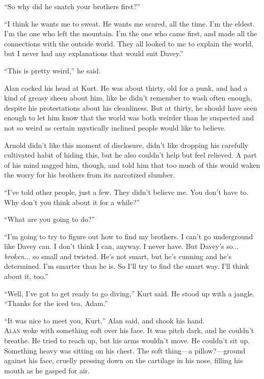 ``So why did he snatch your brothers first?''

``I think he wants me to sweat.  He wants me scared, all the time. 
I'm the eldest.  I'm the one who left the mountain.  I'm the one who
came first, and made all the connections with the outside world.  They
all looked to me to explain the world, but I never had any
explanations that would suit Davey.''

``This is pretty weird,'' he said.

Alan cocked his head at Kurt.  He was about thirty, old for a punk,
and had a kind of greasy sheen about him, like he didn't remember to
wash often enough, despite his protestations about his cleanliness. 
But at thirty, he should have seen enough to let him know that the
world was both weirder than he suspected and not so weird as certain
mystically inclined people would like to believe.

Arnold didn't like this moment of disclosure, didn't like dropping his
carefully cultivated habit of hiding this, but he also couldn't help
but feel relieved.  A part of his mind nagged him, though, and told
him that too much of this would waken the worry for his brothers from
its narcotized slumber.

``I've told other people, just a few.  They didn't believe me.  You
don't have to.  Why don't you think about it for a while?''

``What are you going to do?''

``I'm going to try to figure out how to find my brothers.  I can't go
underground like Davey can.  I don't think I can, anyway.  I never
have.  But Davey's so...  \textit{broken}...  so small and twisted. 
He's not smart, but he's cunning and he's determined.  I'm smarter
than he is.  So I'll try to find the smart way.  I'll think about it,
too.''

``Well, I've got to get ready to go diving,'' Kurt said.  He stood up
with a jangle.  ``Thanks for the iced tea, Adam.''

``It was nice to meet you, Kurt,'' Alan said, and shook his hand.
\\
\lettrine[lines=3, lhang=.5, nindent=0pt, findent=2pt]{A}{lan} woke with something soft over his face.  It was pitch dark, and
he couldn't breathe.  He tried to reach up, but his arms wouldn't
move.  He couldn't sit up.  Something heavy was sitting on his chest. 
The soft thing---a pillow?---ground against his face, cruelly pressing
down on the cartilage in his nose, filling his mouth as he gasped for
air.

